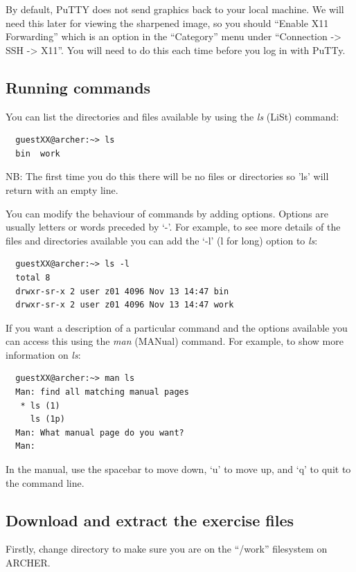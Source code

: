 \documentclass{article}
\begin{document}
By default, PuTTY does not send graphics back to your local
machine. We will need this later for viewing the sharpened image, so
you should ``Enable X11 Forwarding'' which is an option in the
``Category'' menu under ``Connection -> SSH -> X11''. You will need to
do this each time before you log in with PuTTy.

\subsection{Running commands}
\label{sec-3-2}


You can list the directories and files available by
using the \emph{ls} (LiSt) command:


\begin{verbatim}
  guestXX@archer:~> ls
  bin  work
\end{verbatim}

NB: The first time you do this there will be no files or directories
so 'ls' will return with an empty line.

You can modify the behaviour of commands by adding options. Options
are usually letters or words preceded by `-'. For example,
to see more details of the files and directories available you can
add the `-l' (l for long) option to \emph{ls}:


\begin{verbatim}
  guestXX@archer:~> ls -l
  total 8
  drwxr-sr-x 2 user z01 4096 Nov 13 14:47 bin
  drwxr-sr-x 2 user z01 4096 Nov 13 14:47 work
\end{verbatim}

If you want a description of a particular command and the options
available you can access this using the \emph{man} (MANual) command. 
For example, to show more information on \emph{ls}:


\begin{verbatim}
  guestXX@archer:~> man ls
  Man: find all matching manual pages
   * ls (1)
     ls (1p)
  Man: What manual page do you want?
  Man:
\end{verbatim}

In the manual, use the spacebar to move down, `u' to move up,
and `q' to quit to the command line.


\subsection{Download and extract the exercise files}
\label{sec-3-5}


Firstly, change directory to make sure you are on the ``/work''
filesystem on ARCHER.
\end{document}
